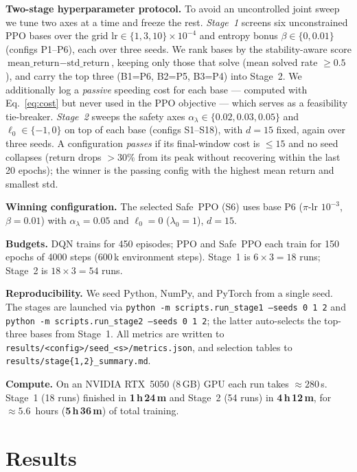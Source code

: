 \documentclass{article}
\newcommand{\eqnref}[1]{Eq.~\eqref{#1}}
\begin{document}
\textbf{Two-stage hyperparameter protocol.} To avoid an uncontrolled joint sweep we tune two axes
at a time and freeze the rest. \emph{Stage~1} screens six unconstrained PPO bases over the grid
$\text{lr} \in \{1, 3, 10\}\times 10^{-4}$ and entropy bonus $\beta \in \{0, 0.01\}$ (configs
P1--P6), each over three seeds. We rank bases by the stability-aware score
$\text{mean\_return} - \text{std\_return}$, keeping only those that solve (mean solved rate
$\ge 0.5$), and carry the top three (B1=P6, B2=P5, B3=P4) into Stage~2. We additionally log a
\emph{passive} speeding cost for each base --- computed with \eqnref{eq:cost} but never used in
the PPO objective --- which serves as a feasibility tie-breaker. \emph{Stage~2} sweeps the safety
axes $\alpha_\lambda \in \{0.02, 0.03, 0.05\}$ and $\ell_0 \in \{-1, 0\}$ on top of each base
(configs S1--S18), with $d{=}15$ fixed, again over three seeds. A configuration \emph{passes} if its
final-window cost is $\le 15$ and no seed collapses (return drops $>30\%$ from its peak without
recovering within the last 20 epochs); the winner is the passing config with the highest mean
return and smallest std.

\textbf{Winning configuration.} The selected Safe~PPO (S6) uses base P6 ($\pi$-lr $10^{-3}$,
$\beta{=}0.01$) with $\alpha_\lambda = 0.05$ and $\ell_0 = 0$ ($\lambda_0 = 1$), $d=15$.

\textbf{Budgets.} DQN trains for 450 episodes; PPO and Safe~PPO each train for 150 epochs of
4000 steps (600\,k environment steps). Stage~1 is $6\times 3 = 18$ runs; Stage~2 is
$18 \times 3 = 54$ runs.

\textbf{Reproducibility.} We seed Python, NumPy, and PyTorch from a single seed. The stages are
launched via \texttt{python -m scripts.run\_stage1 --seeds 0 1 2} and
\texttt{python -m scripts.run\_stage2 --seeds 0 1 2}; the latter auto-selects the top-three bases from
Stage~1. All metrics are written to \texttt{results/<config>/\allowbreak seed\_<s>/\allowbreak metrics.json}, and selection
tables to \texttt{results/stage\{1,2\}\_summary.md}.

\textbf{Compute.} On an NVIDIA RTX~5050 (8\,GB) GPU each run takes $\approx 280$\,s. Stage~1
(18 runs) finished in \textbf{1\,h\,24\,m} and Stage~2 (54 runs) in \textbf{4\,h\,12\,m}, for
$\approx 5.6$~hours (\textbf{5\,h\,36\,m}) of total training.


\section{Results}
\label{sec:results}
\end{document}
